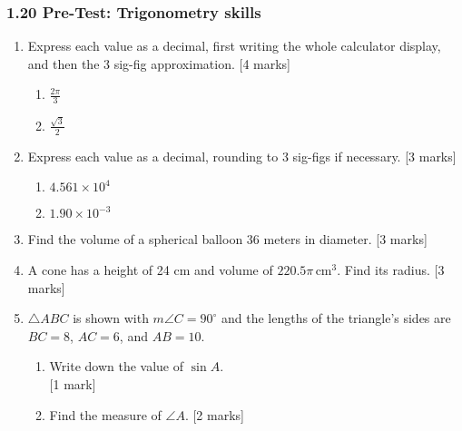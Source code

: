 \documentclass[12pt, twoside]{article}
\begin{document}
\subsubsection*{1.20 Pre-Test: Trigonometry skills}

\begin{enumerate}

  \item Express each value as a decimal, first writing the whole calculator display, and then the 3 sig-fig approximation. \hfill [4 marks]
  \begin{multicols}{2}
    \begin{enumerate}
    \item $\displaystyle \frac{2\pi}{3}$
    \item $\displaystyle \frac{\sqrt{3}}{2}$
    \end{enumerate}
  \end{multicols}

  \item Express each value as a decimal, rounding to 3 sig-figs if necessary. \hfill [3 marks]
  \begin{multicols}{2}
    \begin{enumerate}
    \item $4.561 \times 10^4$
    \item $1.90 \times 10^{-3}$
    \end{enumerate}
  \end{multicols}

  \item Find the volume of a spherical balloon 36 meters in diameter. \hfill [3 marks]
  
  \item A cone has a height of 24 cm and volume of $220.5\pi \,\mathrm{ cm}^3$. Find its radius. \hfill [3 marks]
  
  \item $\triangle ABC$ is shown with $m\angle C=90^\circ$ and the lengths of the triangle's sides are $BC=8$, $AC=6$, and $AB=10$.
  \begin{multicols}{2}
        \begin{enumerate}
        \item Write down the value of $\sin A$.  \\ \hfill [1 mark]\vspace{1cm}
        \item Find the measure of $\angle A$.  \hfill [2 marks] \vspace{1cm}
      \end{enumerate}
    \end{multicols}


\end{enumerate}
\end{document}
